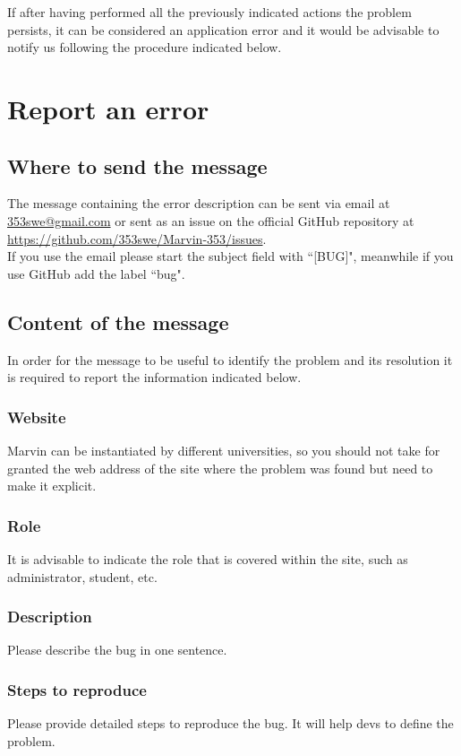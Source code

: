 \documentclass[ManualeUtente]{subfiles}
\begin{document}
If after having performed all the previously indicated actions the problem persists, it can be considered an application error and it would be advisable to notify us following the procedure indicated below.

\section{Report an error}
\subsection{Where to send the message}
The message containing the error description can be sent via email at \href{mailto: 353swe@gmail.com}{ 353swe@gmail.com} or sent as an issue on the official GitHub repository at \href{https://github.com/353swe/Marvin-353/issues}{https://github.com/353swe/Marvin-353/issues}. \\
If you use the email please start the subject field with ``[BUG]", meanwhile if you use GitHub add the label ``bug".

\subsection{Content of the message}
In order for the message to be useful to identify the problem and its resolution it is required to report the information indicated below.

\subsubsection{Website}
Marvin can be instantiated by different universities, so you should not take for granted the web address of the site where the problem was found but need to make it explicit.

\subsubsection{Role}
It is advisable to indicate the role that is covered within the site, such as administrator, student, etc.

\subsubsection{Description}
Please describe the bug in one sentence.

\subsubsection{Steps to reproduce}
Please provide detailed steps to reproduce the bug. It will help devs to define the problem.
\end{document}
